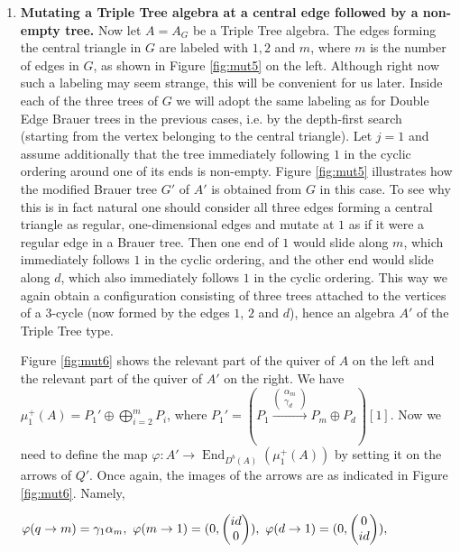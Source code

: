 \documentclass[12pt]{amsart}
\theoremstyle{plain}
\theoremstyle{remark}
\theoremstyle{definition}
\newcommand{\End}{\mathop{\mathrm{End}}\nolimits}
\begin{document}
\begin{enumerate}
\item {\bf Mutating a Triple Tree algebra at a central edge followed by a non-empty tree.} Now let $A=A_G$ be a Triple Tree algebra. The edges forming the central triangle in $G$ are labeled with $1, 2$ and $m$, where $m$ is the number of edges in $G$, as shown in Figure \ref{fig:mut5} on the left. Although right now such a labeling may seem strange, this will be convenient for us later. Inside each of the three trees of $G$ we will adopt the same labeling as for Double Edge Brauer trees in the previous cases, i.e. by the depth-first search (starting from the vertex belonging to the central triangle). Let $j = 1$ and assume additionally that the tree immediately following $1$ in the cyclic ordering around one of its ends is non-empty. Figure \ref{fig:mut5} illustrates how the modified Brauer tree $G'$ of $A'$ is obtained from $G$ in this case. To see why this is in fact natural one should consider all three edges forming a central triangle as regular, one-dimensional edges and mutate at $1$ as if it were a regular edge in a Brauer tree. Then one end of $1$ would slide along $m$, which immediately follows $1$ in the cyclic ordering, and the other end would slide along $d$, which also immediately follows $1$ in the cyclic ordering. This way we again obtain a configuration consisting of three trees attached to the vertices of a 3-cycle (now formed by the edges $1$, $2$ and $d$), hence an algebra $A'$ of the Triple Tree type. 


Figure \ref{fig:mut6} shows the relevant part of the quiver of $A$ on the left and the relevant part of the quiver of $A'$ on the right. We have ${\mu_1^+(A) = P_1' \oplus \bigoplus_{i=2}^m P_i}$, where ${P_1' = (P_1 \xrightarrow{\begin{pmatrix} \alpha_m \\ \gamma_d \end{pmatrix}} P_m \oplus P_d )[1]}$. Now we need to define the map ${\varphi \colon A' \xrightarrow{} \End_{D^b(A)}(\mu_1^+(A))}$ by setting it on the arrows of $Q'$. Once again, the images of the arrows are as indicated in Figure \ref{fig:mut6}. Namely, 

\begin{center}
    
$\varphi(q \to m) = \gamma_1\alpha_m, \,\, \varphi(m \to 1) = (0, {\footnotesize \begin{pmatrix} id \\ 0 \end{pmatrix}}),  \,\,  \varphi(d \to 1) = (0, {\footnotesize\begin{pmatrix} 0 \\ id \end{pmatrix}}), $ 



\end{center}
\end{enumerate}
\end{document}
